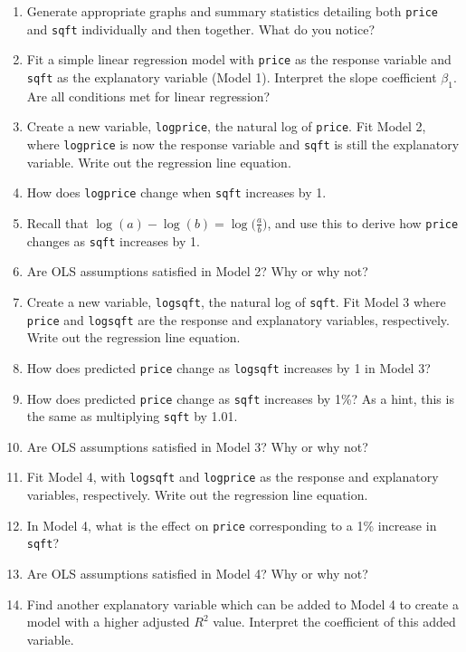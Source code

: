 \documentclass[
]{krantz}
\providecommand{\tightlist}{%
  \setlength{\itemsep}{0pt}\setlength{\parskip}{0pt}}
\begin{document}
\begin{enumerate}
  \begin{enumerate}
  \def\labelenumii{\alph{enumii}.}
  \tightlist
  \item
    Generate appropriate graphs and summary statistics detailing both \texttt{price} and \texttt{sqft} individually and then together. What do you notice?
  \item
    Fit a simple linear regression model with \texttt{price} as the response variable and \texttt{sqft} as the explanatory variable (Model 1). Interpret the slope coefficient \(\beta_1\). Are all conditions met for linear regression?
  \item
    Create a new variable, \texttt{logprice}, the natural log of \texttt{price}. Fit Model 2, where \texttt{logprice} is now the response variable and \texttt{sqft} is still the explanatory variable. Write out the regression line equation.
  \item
    How does \texttt{logprice} change when \texttt{sqft} increases by 1.
  \item
    Recall that \(\log(a) - \log(b) = \log\big(\frac{a}{b}\big)\), and use this to derive how \texttt{price} changes as \texttt{sqft} increases by 1.
  \item
    Are OLS assumptions satisfied in Model 2? Why or why not?
  \item
    Create a new variable, \texttt{logsqft}, the natural log of \texttt{sqft}. Fit Model 3 where \texttt{price} and \texttt{logsqft} are the response and explanatory variables, respectively. Write out the regression line equation.
  \item
    How does predicted \texttt{price} change as \texttt{logsqft} increases by 1 in Model 3?
  \item
    How does predicted \texttt{price} change as \texttt{sqft} increases by 1\%? As a hint, this is the same as multiplying \texttt{sqft} by 1.01.
  \item
    Are OLS assumptions satisfied in Model 3? Why or why not?
  \item
    Fit Model 4, with \texttt{logsqft} and \texttt{logprice} as the response and explanatory variables, respectively. Write out the regression line equation.
  \item
    In Model 4, what is the effect on \texttt{price} corresponding to a 1\% increase in \texttt{sqft}?
  \item
    Are OLS assumptions satisfied in Model 4? Why or why not?
  \item
    Find another explanatory variable which can be added to Model 4 to create a model with a higher adjusted \(R^2\) value. Interpret the coefficient of this added variable.
  \end{enumerate}
\end{enumerate}
\end{document}

